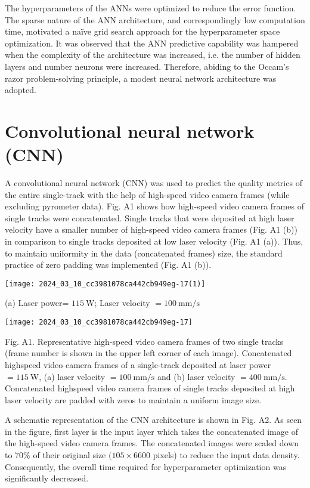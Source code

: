 \documentclass[10pt]{article}
\begin{document}
The hyperparameters of the ANNs were optimized to reduce the error function. The sparse nature of the ANN architecture, and correspondingly low computation time, motivated a naïve grid search approach for the hyperparameter space optimization. It was observed that the ANN predictive capability was hampered when the complexity of the architecture was increased, i.e. the number of hidden layers and number neurons were increased. Therefore, abiding to the Occam's razor problem-solving principle, a modest neural network architecture was adopted.

\section*{Convolutional neural network (CNN)}
A convolutional neural network (CNN) was used to predict the quality metrics of the entire single-track with the help of high-speed video camera frames (while excluding pyrometer data). Fig. A1 shows how high-speed video camera frames of single tracks were concatenated. Single tracks that were deposited at high laser velocity have a smaller number of high-speed video camera frames (Fig. A1 (b)) in comparison to single tracks deposited at low laser velocity (Fig. A1 (a)). Thus, to maintain uniformity in the data (concatenated frames) size, the standard practice of zero padding was implemented (Fig. A1 (b)).

\begin{center}
\texttt{[image: 2024\_03\_10\_cc3981078ca442cb949eg-17(1)]}
\end{center}

(a) Laser power= $115 \mathrm{~W}$; Laser velocity $=100 \mathrm{~mm} / \mathrm{s}$

\begin{center}
\texttt{[image: 2024\_03\_10\_cc3981078ca442cb949eg-17]}
\end{center}

Fig. A1. Representative high-speed video camera frames of two single tracks (frame number is shown in the upper left corner of each image). Concatenated highspeed video camera frames of a single-track deposited at laser power $=115 \mathrm{~W}$, (a) laser velocity $=100 \mathrm{~mm} / \mathrm{s}$ and (b) laser velocity $=400 \mathrm{~mm} / \mathrm{s}$. Concatenated highspeed video camera frames of single tracks deposited at high laser velocity are padded with zeros to maintain a uniform image size.

A schematic representation of the CNN architecture is shown in Fig. A2. As seen in the figure, first layer is the input layer which takes the concatenated image of the high-speed video camera frames. The concatenated images were scaled down to $70 \%$ of their original size $(105 \times 6600$ pixels) to reduce the input data density. Consequently, the overall time required for hyperparameter optimization was significantly decreased.
\end{document}
